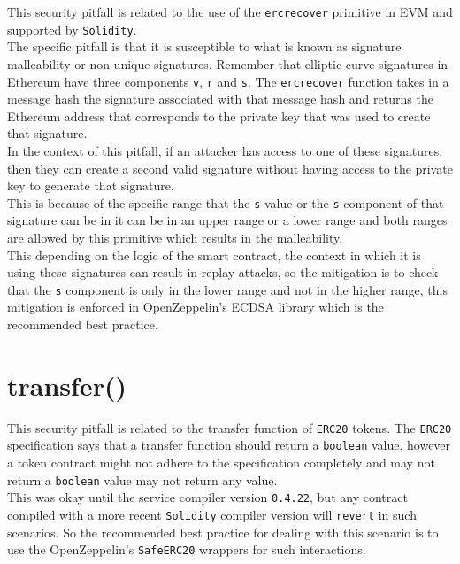 This security pitfall is related to the use of the \texttt{ercrecover} primitive in EVM and supported by \texttt{Solidity}.\\

The specific pitfall is that it is susceptible to what is known as signature malleability or non-unique signatures. Remember that elliptic curve signatures in Ethereum have three components \texttt{v}, \texttt{r} and \texttt{s}. The \texttt{ercrecover} function takes in a message hash the signature associated with that message hash and returns the Ethereum address that corresponds to the private key that was used to create that signature.\\

In the context of this pitfall, if an attacker has access to one of these signatures, then they can create a second valid signature without having access to the private key to generate that signature. \\

This is because of the specific range that the \texttt{s} value or the \texttt{s} component of that signature can be in it can be in an upper range or a lower range and both ranges are allowed by this primitive which results in the malleability.\\

This depending on the logic of the smart contract, the context in which it is using these signatures can result in replay attacks, so the mitigation is to check that the \texttt{s} component is only in the lower range and not in the higher range, this mitigation is enforced in OpenZeppelin's ECDSA library which is the recommended best practice.

\section{transfer()}

This security pitfall is related to the transfer function of \texttt{ERC20} tokens. The \texttt{ERC20} specification says that a transfer function should return a \texttt{boolean} value, however a token contract might not adhere to the specification completely and may not return a \texttt{boolean} value may not return any value.\\

This was okay until the service compiler version \texttt{0.4.22}, but any contract compiled with a more recent \texttt{Solidity} compiler version will \texttt{revert} in such scenarios. So the recommended best practice for dealing with this scenario is to use the OpenZeppelin's \texttt{SafeERC20} wrappers for such interactions.


